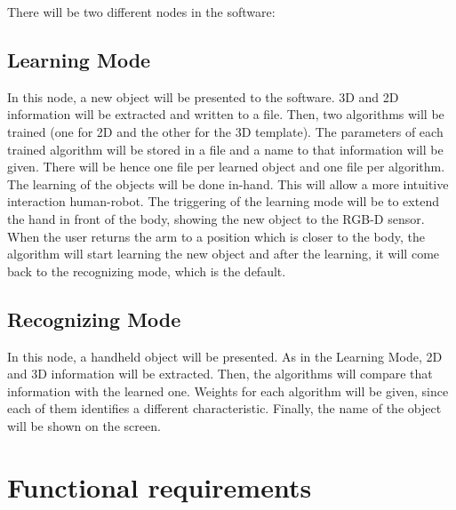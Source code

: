 \documentclass{article}
\begin{document}
There will be two different nodes in the software:

\subsection{Learning Mode}

\hspace{0.5cm}In this node, a new object will be presented to the software. 3D and 2D information will be extracted and written to a file. Then, two algorithms will be trained (one for 2D and the other for the 3D template). The parameters of each trained algorithm will be stored in a file and a name to that information will be given. There will be hence one file per learned object and one file per algorithm.
\\

The learning of the objects will be done in-hand. This will allow a more intuitive interaction human-robot. The triggering of the learning mode will be to extend the hand in front of the body, showing the new object to the RGB-D sensor. When the user returns the arm to a position which is closer to the body, the algorithm will start learning the new object and after the learning, it will come back to the recognizing mode, which is the default. 


\subsection{Recognizing Mode} 
\hspace{0.5cm}In this node, a handheld object will be presented. As in the Learning Mode, 2D and 3D information will be extracted. Then, the algorithms will compare that information with the learned one. Weights for each algorithm will be given, since each of them identifies a different characteristic. Finally, the name of the object will be shown on the screen. 



\section{Functional requirements}
\end{document}

